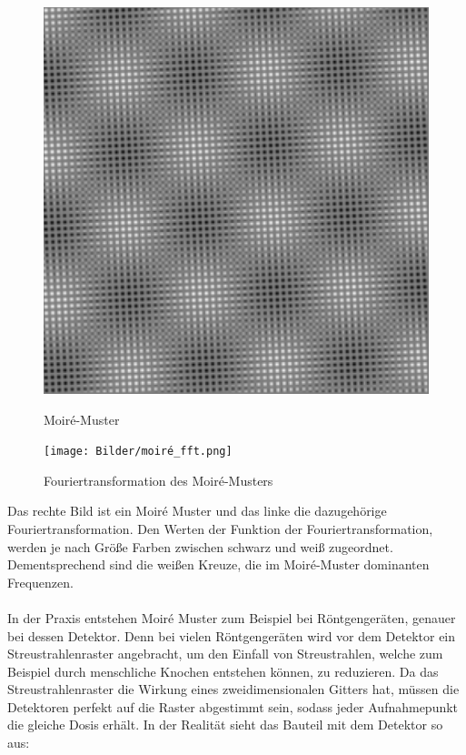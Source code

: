 \documentclass[a4paper,12pt]{article}
\theoremstyle{definition}
\theoremstyle{remark}
\begin{document}
\begin{figure}[H]
  \centering
  \begin{minipage}{0.49\textwidth}
    \centering
    \includegraphics[width=\linewidth]{Bilder/moiré.png}
    \caption{Moiré-Muster}
    \label{fig:bild1}
  \end{minipage}
  \hfill
  \begin{minipage}{0.49\textwidth}
    \centering
    \texttt{[image: Bilder/moiré\_fft.png]}
    \caption{Fouriertransformation des Moiré-Musters}
    \label{fig:bild2}
  \end{minipage}
\end{figure}

Das rechte Bild ist ein Moiré Muster und das linke die dazugehörige Fouriertransformation. Den Werten der Funktion der Fouriertransformation, werden 
je nach Größe Farben zwischen schwarz und weiß zugeordnet. Dementsprechend sind die weißen Kreuze, die im Moiré-Muster dominanten Frequenzen. 
\\\\
In der Praxis entstehen Moiré Muster zum Beispiel bei Röntgengeräten, genauer bei dessen Detektor. Denn bei vielen Röntgengeräten wird vor dem Detektor 
ein Streustrahlenraster angebracht, um den Einfall von Streustrahlen, welche zum Beispiel durch menschliche Knochen entstehen können, zu reduzieren. 
Da das Streustrahlenraster die Wirkung eines zweidimensionalen Gitters hat, müssen die Detektoren perfekt auf die Raster abgestimmt sein, sodass jeder 
Aufnahmepunkt die gleiche Dosis erhält. In der Realität sieht das Bauteil mit dem Detektor so aus:
\end{document}
